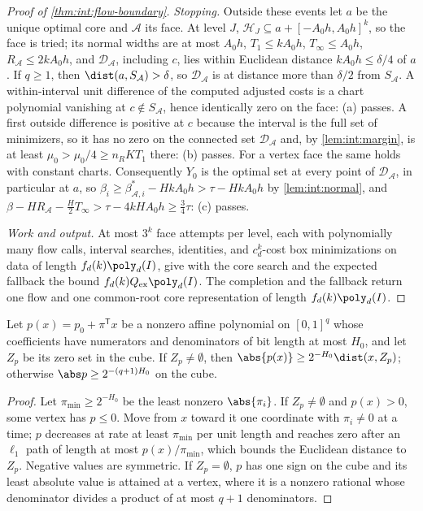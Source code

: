 \begin{proof}[Proof of \cref{thm:int:flow-boundary}]
\emph{Stopping.} Outside these events let $a$ be the unique optimal core and
$\mathcal A$ its face. At level $J$, $\mathcal H_J\subseteq a+[-A_0h,A_0h]^k$, so the face
is tried; its normal widths are at most $A_0h$, $T_1\le kA_0h$, $T_\infty\le A_0h$,
$R_{\mathcal A}\le2kA_0h$, and $\mathcal D_{\mathcal A}$, including $c$, lies within
Euclidean distance $kA_0h\le\delta/4$ of $a$. If $q\ge1$, then $\dist(a,S_{\mathcal A})>\delta$,
so $\mathcal D_{\mathcal A}$ is at distance more than $\delta/2$ from $S_{\mathcal A}$. A
within-interval unit difference of the computed adjusted costs is a chart polynomial
vanishing at $c\notin S_{\mathcal A}$, hence identically zero on the face: (a) passes.
A first outside difference is positive at $c$ because the interval is the full set of
minimizers, so it has no zero on the connected set $\mathcal D_{\mathcal A}$ and, by
\cref{lem:int:margin}, is at least $\mu_0>\mu_0/4\ge n_RKT_1$ there: (b) passes. For a
vertex face the same holds with constant charts. Consequently $Y_0$ is the optimal set
at every point of $\mathcal D_{\mathcal A}$, in particular at $a$, so
$\beta_i\ge\beta^*_{\mathcal A,i}-HkA_0h>\tau-HkA_0h$ by \cref{lem:int:normal}, and
$\beta-HR_{\mathcal A}-\frac H2T_\infty>\tau-4kHA_0h\ge\frac34\tau$: (c) passes.

\emph{Work and output.} At most $3^k$ face attempts per level, each with polynomially
many flow calls, interval searches, identities, and $c_d^k$-cost box minimizations on
data of length $f_d(k)\poly_d(I)$, give with the core search and the expected fallback
the bound $f_d(k)Q_{\rm ex}\poly_d(I)$. The completion and the fallback return one flow
and one common-root core representation of length $f_d(k)\poly_d(I)$.
\end{proof}

\begin{lemma}\label{lem:int:affine-margin}
Let $p(x)=p_0+\pi^{\mathsf T}x$ be a nonzero affine polynomial on $[0,1]^q$ whose
coefficients have numerators and denominators of bit length at most $H_0$, and let
$Z_p$ be its zero set in the cube. If $Z_p\ne\emptyset$, then
$\abs{p(x)}\ge2^{-H_0}\dist(x,Z_p)$; otherwise $\abs p\ge2^{-(q+1)H_0}$ on the cube.
\end{lemma}

\begin{proof}
Let $\pi_{\min}\ge2^{-H_0}$ be the least nonzero $\abs{\pi_i}$. If $Z_p\ne\emptyset$ and
$p(x)>0$, some vertex has $p\le0$. Move from $x$ toward it one coordinate with
$\pi_i\ne0$ at a time; $p$ decreases at rate at least $\pi_{\min}$ per unit length and
reaches zero after an $\ell_1$ path of length at most $p(x)/\pi_{\min}$, which bounds the
Euclidean distance to $Z_p$. Negative values are symmetric. If $Z_p=\emptyset$, $p$
has one sign on the cube and its least absolute value is attained at a vertex, where
it is a nonzero rational whose denominator divides a product of at most $q+1$
denominators.
\end{proof}

